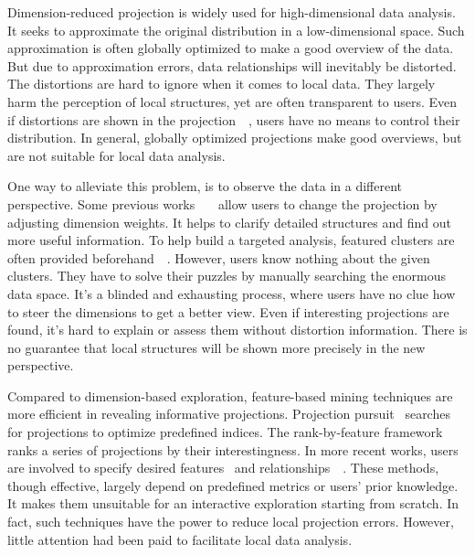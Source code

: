 \maketitle
Dimension-reduced projection is widely used for high-dimensional data analysis. It seeks to approximate the original distribution in a low-dimensional space. Such approximation is often globally optimized to make a good overview of the data. But due to approximation errors, data relationships will inevitably be distorted. The distortions are hard to ignore when it comes to local data. They largely harm the perception of local structures, yet are often transparent to users. Even if distortions are shown in the projection~\cite{DBLP:journals/tvcg/StahnkeDMT16}~\cite{DBLP:journals/ijon/Aupetit07}, users have no means to control their distribution. In general, globally optimized projections make good overviews, but are not suitable for local data analysis.

One way to alleviate this problem, is to observe the data in a different perspective. Some previous works~\cite{DBLP:journals/cgf/JeongZFRC09}~\cite{DBLP:journals/tvcg/NamM13}~\cite{DBLP:journals/tvcg/LehmannT13} allow users to change the projection by adjusting dimension weights. It helps to clarify detailed structures and find out more useful information. To help build a targeted analysis, featured clusters are often provided beforehand~\cite{DBLP:journals/tvcg/NamM13}~\cite{DBLP:journals/cgf/LiuWTBP15}. However, users know nothing about the given clusters. They have to solve their puzzles by manually searching the enormous data space. It's a blinded and exhausting process, where users have no clue how to steer the dimensions to get a better view. Even if interesting projections are found, it's hard to explain or assess them without distortion information. There is no guarantee that local structures will be shown more precisely in the new perspective.

Compared to dimension-based exploration, feature-based mining techniques are more efficient in revealing informative projections. Projection pursuit~\cite{DBLP:journals/tc/FriedmanT74} searches for projections to optimize predefined indices. The rank-by-feature framework~\cite{DBLP:journals/ivs/SeoS05} ranks a series of projections by their interestingness. In more recent works, users are involved to specify desired features~\cite{DBLP:journals/tvcg/JohanssonJ09} and relationships~\cite{DBLP:journals/tvcg/HuBMHNL13}~\cite{DBLP:journals/tvcg/Gleicher13}. These methods, though effective, largely depend on predefined metrics or users' prior knowledge. It makes them unsuitable for an interactive exploration starting from scratch. In fact, such techniques have the power to reduce local projection errors. However, little attention had been paid to facilitate local data analysis.

